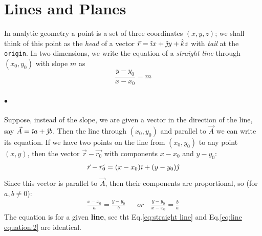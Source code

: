         \section{Lines and Planes}
            In analytic geometry a point is a set of three coordinates $(x,y,z)$; we shall think of 
            this point as the \textit{head} of a vector $\vec{r} = \hat{\imath} x + \hat{\jmath} y + \hat{k} z$ with 
            \textit{tail} at the \texttt{origin}.
            In two dimensions, we write the equation of a \textit{straight line} through $(x_0,y_0)$ with slope $m$ as
            \begin{equation}
                \label{eq:straight line}
                \frac{y-y_0}{x-x_0} = m
            \end{equation}

            \paragraph{$\bullet$} Suppose, instead of the slope, we are given a vector in the direction 
            of the line, say $\vec{A} = \hat{\imath} a+\hat{\jmath} b$. Then the line through $(x_0,y_0)$ and parallel to
            $\vec{A}$ we can write its equation. If we have two points on the line from $(x_0,y_0)$
            to any point $(x,y)$, then the vector $\vec{r} - \vec{r_0}$ with components $x-x_0 $ and $y-y_0$:
            \begin{align}
                \label{eq:vector bewtween two points}
                \vec{r} - \vec{r_0} = (x-x_0)\hat{\imath}  + (y-y_0)\hat{\jmath} 
            \end{align}
            Since this vector is parallel to $\vec{A}$, then their components are proportional, so (for $a, b\neq 0$):
            \begin{align}
                \label{eq:line equation:2}
                \frac{x-x_0}{a} = \frac{y-y_0}{b} && or\quad \frac{y-y_0}{x-x_0} = \frac{b}{a}
            \end{align}
            The equation is for a given \textbf{line}, see tht Eq.\eqref{eq:straight line} and 
            Eq.\eqref{eq:line equation:2} are identical.

